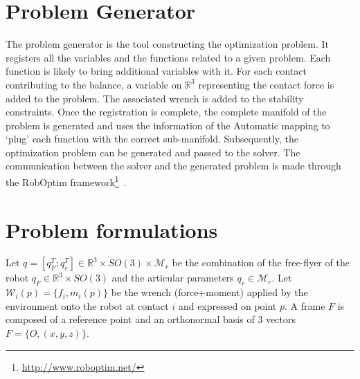 \section{Problem Generator}
\label{problem_generator}

The problem generator is the tool constructing the optimization problem.
It registers all the variables and the functions related to a given problem.
Each function is likely to bring additional variables with it.
For each contact contributing to the balance, a variable on $\mathbb{R}^3$ representing the contact force is added to the problem.
The associated wrench is added to the stability constraints.
Once the registration is complete, the complete manifold of the problem is generated and uses the information of the Automatic mapping to `plug' each function with the correct sub-manifold.
Subsequently, the optimization problem can be generated and passed to the solver.
The communication between the solver and the generated problem is made through the RobOptim framework\footnote{\url{http://www.roboptim.net/}}~\cite{moulard:jsme:2013, moulard:jrsj:2014}.

\section{Problem formulations}
\label{sec:problem_formulations}

Let $q=[q_F^T; q_r^T]\in\mathbb{R}^3\times SO(3)\times \mathcal{M}_r$ be the combination of the free-flyer of the robot $q_F\in \mathbb{R}^3 \times SO(3)$ and the articular parameters $q_r\in\mathcal{M}_r$.
Let $\mathcal{W}_i(p)=\{f_i,m_i(p)\}$ be the wrench (force+moment) applied by the environment onto the robot at contact $i$ and expressed on point $p$.
A frame $F$ is composed of a reference point and an orthonormal basis of 3 vectors $F = \{O, (x, y, z)\}$.


